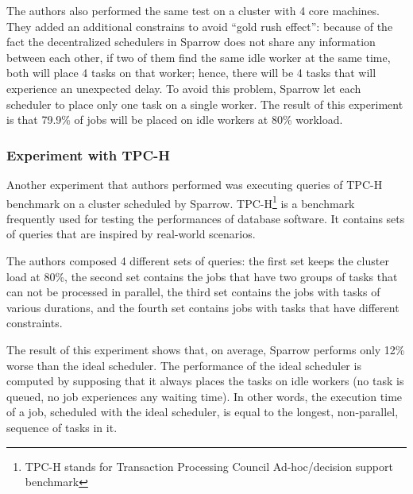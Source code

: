\documentclass[11pt]{article}
\begin{document}
            The authors also performed the same test on a cluster with 4 core machines. They added an additional constrains to avoid ``gold rush effect'': because of the fact the decentralized schedulers in Sparrow does not share any information between each other, if two of them find the same idle worker at the same time, both will place 4 tasks on that worker; hence, there will be 4 tasks that will experience an unexpected delay. To avoid this problem, Sparrow let each scheduler to place only one task on a single worker. The result of this experiment is that 79.9\% of jobs will be placed on idle workers at 80\% workload.
            
            
        \subsubsection*{Experiment with TPC-H}
        
        	Another experiment that authors performed was executing queries of TPC-H benchmark on a cluster scheduled by Sparrow. TPC-H\footnote{TPC-H stands for Transaction Processing Council Ad-hoc/decision support benchmark} is a benchmark frequently used for testing the performances of database software. It contains sets of queries that are inspired by real-world scenarios.
            
            The authors composed 4 different sets of queries: the first set keeps the cluster load at 80\%, the second set contains the jobs that have two groups of tasks that can not be processed in parallel, the third set contains the jobs with tasks of various durations, and the fourth set contains jobs with tasks that have different constraints.
            
            The result of this experiment shows that, on average, Sparrow performs only 12\% worse than the ideal scheduler. The performance of the ideal scheduler is computed by supposing that it always places the tasks on idle workers (no task is queued, no job experiences any waiting time). In other words, the execution time of a job, scheduled with the ideal scheduler, is equal to the longest, non-parallel, sequence of tasks in it.
            
\end{document}
